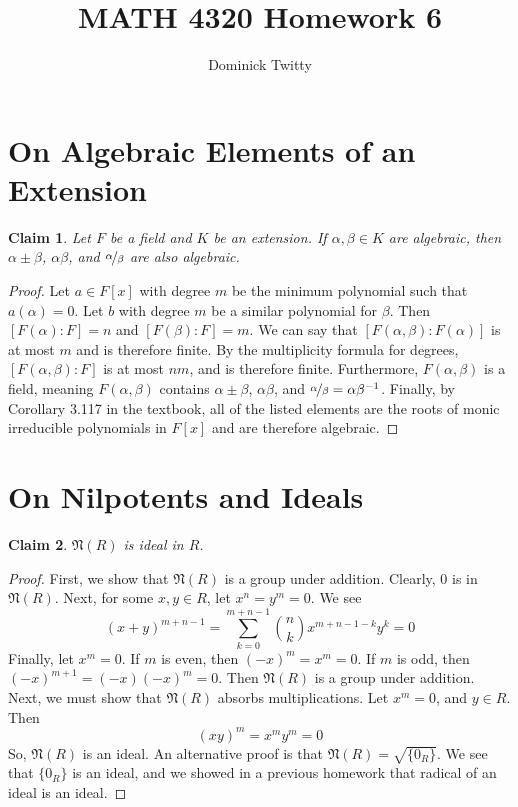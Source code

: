 \documentclass[12pt]{article}
\newtheorem*{claim*}{Claim}
\newcommand*{\nil}{\mathfrak{N}}
\newcommand*{\inv}{^{-1}}
\begin{document}
\title{MATH 4320 Homework 6}
\author{Dominick Twitty}
\date{}
\maketitle

\section{On Algebraic Elements of an Extension}
\begin{claim*}
Let $F$ be a field and $K$ be an extension. If $\alpha, \beta \in K$ are algebraic, then $\alpha \pm \beta$, $\alpha \beta$, and $\nicefrac{\alpha}{\beta}$ are also algebraic.
\end{claim*}
\begin{proof}
Let $a \in F[x]$ with degree $m$ be the minimum polynomial such that $a(\alpha) = 0$. Let $b$ with degree $m$ be a similar polynomial for $\beta$. Then $[F(\alpha) : F] = n$ and $[F(\beta) : F] = m$. We can say that $[F(\alpha, \beta) : F(\alpha)]$ is at most $m$ and is therefore finite. By the multiplicity formula for degrees, $[F(\alpha,\beta) : F]$ is at most $nm$, and is therefore finite. Furthermore, $F(\alpha, \beta)$ is a field, meaning $F(\alpha, \beta)$ contains $\alpha \pm \beta$, $\alpha \beta$, and $\nicefrac{\alpha}{\beta} = \alpha \beta\inv$. Finally, by Corollary 3.117 in the textbook, all of the listed elements are the roots of monic irreducible polynomials in $F[x]$ and are therefore algebraic.
\end{proof}



\section{On Nilpotents and Ideals}
\begin{claim*}
$\nil(R)$ is ideal in $R$.
\end{claim*}
\begin{proof}
First, we show that $\nil(R)$ is a group under addition. Clearly, $0$ is in $\nil(R)$. Next, for some $x,y \in R$, let $x^n = y^m = 0$. We see
\[ (x + y) ^ {m + n - 1} = \sum_{k = 0}^{m + n - 1} \binom{n}{k} x^{m + n - 1 - k} y^k = 0\]
Finally, let $x ^ m = 0$. If $m$ is even, then $(-x) ^ m = x ^ m = 0$. If $m$ is odd, then $(-x) ^ {m + 1} = (-x)(-x)^m = 0$. Then $\nil(R)$ is a group under addition. Next, we must show that $\nil(R)$ absorbs multiplications. Let $x^m = 0$, and $y \in R$. Then
\[ (xy) ^ m = x^m y^m = 0 \]
So, $\nil(R)$ is an ideal. An alternative proof is that $\nil(R) = \sqrt{\{0_R\}}$. We see that $\{0_R\}$ is an ideal, and we showed in a previous homework that radical of an ideal is an ideal.
\end{proof}
\end{document}
